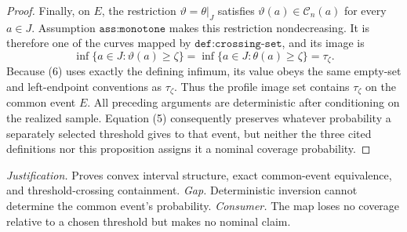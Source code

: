 \documentclass{article}
\begin{document}
\begin{proof}
Finally, on \(E\), the restriction \(\vartheta=\theta|_J\) satisfies \(\vartheta(a)\in\mathcal C_n(a)\) for every \(a\in J\).  Assumption \(\texttt{ass:monotone}\) makes this restriction nondecreasing.  It is therefore one of the curves mapped by \(\texttt{def:crossing-set}\), and its image is
\[
 \inf\{a\in J:\vartheta(a)\ge\zeta\}
 =\inf\{a\in J:\theta(a)\ge\zeta\}
 =\tau_\zeta.                                                 \tag{6}
\]
Because (6) uses exactly the defining infimum, its value obeys the same empty-set and left-endpoint conventions as \(\tau_\zeta\).  Thus the profile image set contains \(\tau_\zeta\) on the common event \(E\).  All preceding arguments are deterministic after conditioning on the realized sample.  Equation (5) consequently preserves whatever probability a separately selected threshold gives to that event, but neither the three cited definitions nor this proposition assigns it a nominal coverage probability.
\end{proof}
\par\smallskip\noindent \textit{Justification.} Proves convex interval structure, exact common-event equivalence, and threshold-crossing containment. \textit{Gap.} Deterministic inversion cannot determine the common event's probability. \textit{Consumer.} The map loses no coverage relative to a chosen threshold but makes no nominal claim.
\end{document}
